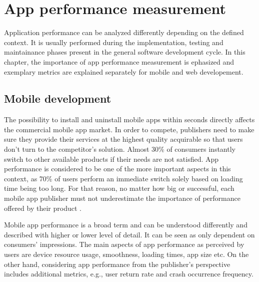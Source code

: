 
\chapter{App performance measurement}\label{chap:app_performance}

Application performance can be analyzed differently depending on the defined context. It is usually performed during the implementation, testing and maintainance phases present in the general software development cycle. In this chapter, the importance of app performance measurement is ephasized and exemplary metrics are explained separately for mobile and web developement.

\section{Mobile development}

The possibility to install and uninstall mobile apps within seconds directly affects the commercial mobile app market. In order to compete, publishers need to make sure they provide their services at the highest quality acquirable so that users don't turn to the competitor's solution. Almost 30\% of consumers instantly switch to other available products if their needs are not satisfied. App performance is considered to be one of the more important aspects in this context, as 70\% of users perform an immediate switch solely based on loading time being too long. For that reason, no matter how big or successful, each mobile app publisher must not underestimate the importance of performance offered by their product \cite{micro_moments_guide}. 

Mobile app performance is a broad term and can be understood differently and described with higher or lower level of detail. It can be seen as only dependent on consumers' impressions. The main aspects of app performance as perceived by users are device resource usage, smoothness, loading times, app size etc. On the other hand, considering app performance from the publisher's perspective includes additional metrics, e.g., user return rate and crash occurrence frequency.

